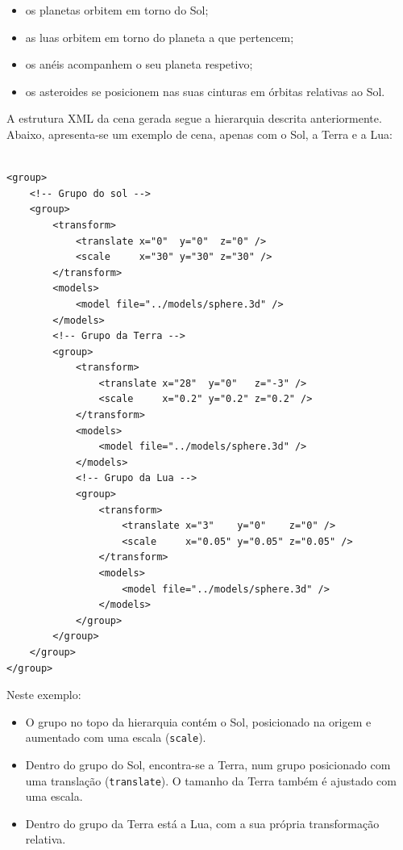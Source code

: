 \documentclass[12pt, a4paper]{article}
\begin{document}
\begin{itemize}
    \item os planetas orbitem em torno do Sol;
    \item as luas orbitem em torno do planeta a que pertencem;
    \item os anéis acompanhem o seu planeta respetivo;
    \item os asteroides se posicionem nas suas cinturas em órbitas relativas ao Sol.
\end{itemize}

A estrutura XML da cena gerada segue a hierarquia descrita anteriormente. Abaixo, apresenta-se um
exemplo de cena, apenas com o Sol, a Terra e a Lua:

\lstset{language=xml}
\begin{lstlisting}

<group>
    <!-- Grupo do sol -->
    <group>
        <transform>
            <translate x="0"  y="0"  z="0" />
            <scale     x="30" y="30" z="30" />
        </transform>
        <models>
            <model file="../models/sphere.3d" />
        </models>
        <!-- Grupo da Terra -->
        <group>
            <transform>
                <translate x="28"  y="0"   z="-3" />
                <scale     x="0.2" y="0.2" z="0.2" />
            </transform>
            <models>
                <model file="../models/sphere.3d" />
            </models>
            <!-- Grupo da Lua -->
            <group>
                <transform>
                    <translate x="3"    y="0"    z="0" />
                    <scale     x="0.05" y="0.05" z="0.05" />
                </transform>
                <models>
                    <model file="../models/sphere.3d" />
                </models>
            </group>
        </group>
    </group>
</group>
\end{lstlisting}

Neste exemplo:
\begin{itemize}
    \item O grupo no topo da hierarquia contém o Sol, posicionado na origem e aumentado com
        uma escala (\texttt{scale}).
    \item Dentro do grupo do Sol, encontra-se a Terra, num grupo posicionado com uma translação
        (\texttt{translate}). O tamanho da Terra também é ajustado com uma escala.
    \item Dentro do grupo da Terra está a Lua, com a sua própria transformação relativa.
\end{itemize}
\end{document}
